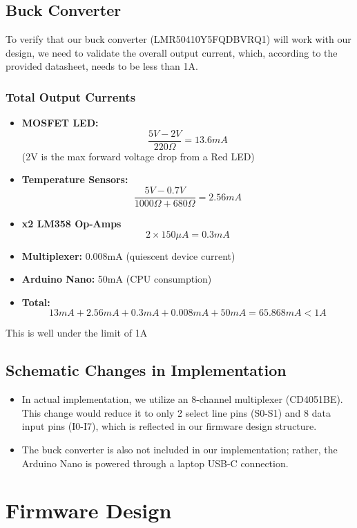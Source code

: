 \documentclass{article}
\begin{document}
\subsection{Buck Converter}
To verify that our buck converter (LMR50410Y5FQDBVRQ1) will work with our design, we need to validate the overall output current, which, according to the provided datasheet, needs to be less than 1A.
\subsubsection*{Total Output Currents}
\begin{itemize}
    \item \textbf{MOSFET LED:}
    \[
    \frac{5V-2V}{220\Omega} = 13.6mA 
    \]
    (2V is the max forward voltage drop from a Red LED)
    \item \textbf{Temperature Sensors:}
    \[
    \frac{5V-0.7V}{1000\Omega+680\Omega} = 2.56mA
    \]
    \item \textbf{x2 LM358 Op-Amps}
    \[
    2\times 150\mu A = 0.3mA
    \]
    \item \textbf{Multiplexer:} 0.008mA (quiescent device current)

    \item \textbf{Arduino Nano:} 50mA (CPU consumption)
    \item \textbf{Total:}
    \[
    13mA + 2.56mA + 0.3mA + 0.008mA + 50mA = 65.868mA < 1A
    \]
\end{itemize}
This is well under the limit of 1A
\subsection{Schematic Changes in Implementation}

\begin{itemize}
    \item In actual implementation, we utilize an 8-channel multiplexer (CD4051BE). This change would reduce it to only 2 select line pins (S0-S1) and 8 data input pins (I0-I7), which is reflected in our firmware design structure. 
    \item The buck converter is also not included in our implementation; rather, the Arduino Nano is powered through a laptop USB-C connection. 
\end{itemize}


\section{Firmware Design}
\end{document}
